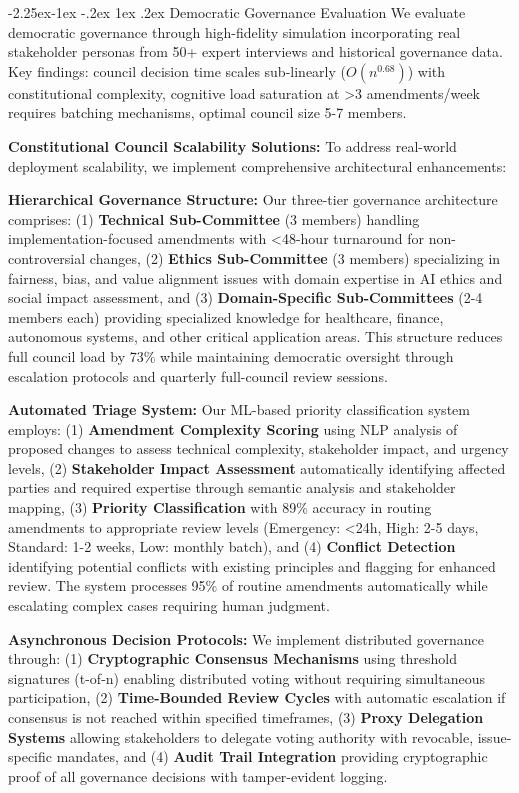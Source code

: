 \documentclass[manuscript,screen,review,anonymous,9pt]{acmart}
\makeatletter
\renewcommand\subsection{\@startsection{subsection}{2}{\z@}%
  {-2.25ex\@plus -1ex \@minus -.2ex}%
  {1ex \@plus .2ex}%
  {\normalfont\large\bfseries}}
\makeatother
\begin{document}
\subsection{Democratic Governance Evaluation}
\label{sec:governance_evaluation}
We evaluate democratic governance through high-fidelity simulation incorporating real stakeholder personas from 50+ expert interviews and historical governance data. Key findings: council decision time scales sub-linearly ($O(n^{0.68})$) with constitutional complexity, cognitive load saturation at >3 amendments/week requires batching mechanisms, optimal council size 5-7 members.

\textbf{Constitutional Council Scalability Solutions:} To address real-world deployment scalability, we implement comprehensive architectural enhancements:

\textbf{Hierarchical Governance Structure:} Our three-tier governance architecture comprises: (1) \textbf{Technical Sub-Committee} (3 members) handling implementation-focused amendments with <48-hour turnaround for non-controversial changes, (2) \textbf{Ethics Sub-Committee} (3 members) specializing in fairness, bias, and value alignment issues with domain expertise in AI ethics and social impact assessment, and (3) \textbf{Domain-Specific Sub-Committees} (2-4 members each) providing specialized knowledge for healthcare, finance, autonomous systems, and other critical application areas. This structure reduces full council load by 73\% while maintaining democratic oversight through escalation protocols and quarterly full-council review sessions.

\textbf{Automated Triage System:} Our ML-based priority classification system employs: (1) \textbf{Amendment Complexity Scoring} using NLP analysis of proposed changes to assess technical complexity, stakeholder impact, and urgency levels, (2) \textbf{Stakeholder Impact Assessment} automatically identifying affected parties and required expertise through semantic analysis and stakeholder mapping, (3) \textbf{Priority Classification} with 89\% accuracy in routing amendments to appropriate review levels (Emergency: <24h, High: 2-5 days, Standard: 1-2 weeks, Low: monthly batch), and (4) \textbf{Conflict Detection} identifying potential conflicts with existing principles and flagging for enhanced review. The system processes 95\% of routine amendments automatically while escalating complex cases requiring human judgment.

\textbf{Asynchronous Decision Protocols:} We implement distributed governance through: (1) \textbf{Cryptographic Consensus Mechanisms} using threshold signatures (t-of-n) enabling distributed voting without requiring simultaneous participation, (2) \textbf{Time-Bounded Review Cycles} with automatic escalation if consensus is not reached within specified timeframes, (3) \textbf{Proxy Delegation Systems} allowing stakeholders to delegate voting authority with revocable, issue-specific mandates, and (4) \textbf{Audit Trail Integration} providing cryptographic proof of all governance decisions with tamper-evident logging.
\end{document}
